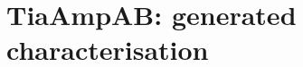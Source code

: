 \documentclass[11pt]{article}
\begin{document}
\section*{TiaAmpAB: generated characterisation}

\end{document}
